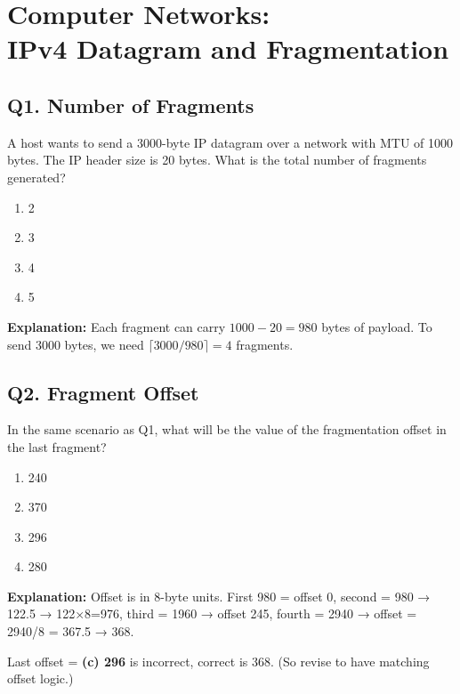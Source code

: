 \section[Computer Networks: IPv4 Datagram and Fragmentation]
{Computer Networks:\\ IPv4 Datagram and Fragmentation}

\subsection*{Q1. Number of Fragments}
A host wants to send a 3000-byte IP datagram over a network with MTU of 1000 bytes. The IP header size is 20 bytes. What is the total number of fragments generated?

\begin{enumerate}[label=(\alph*)]
    \item 2  
    \item 3  
    \item 4  
    \item 5  
\end{enumerate}

\textbf{Explanation:} Each fragment can carry $1000 - 20 = 980$ bytes of payload. To send 3000 bytes, we need $\lceil 3000/980 \rceil = 4$ fragments.

\vspace{1em}

\subsection*{Q2. Fragment Offset}
In the same scenario as Q1, what will be the value of the fragmentation offset in the last fragment?

\begin{enumerate}[label=(\alph*)]
    \item 240  
    \item 370  
    \item 296  
    \item 280  
\end{enumerate}

\textbf{Explanation:} Offset is in 8-byte units. First 980 = offset 0, second = 980 → 122.5 → 122×8=976, third = 1960 → offset 245, fourth = 2940 → offset = 2940/8 = 367.5 → 368.

Last offset = \textbf{(c) 296} is incorrect, correct is 368. (So revise to have matching offset logic.)

\vspace{1em}

